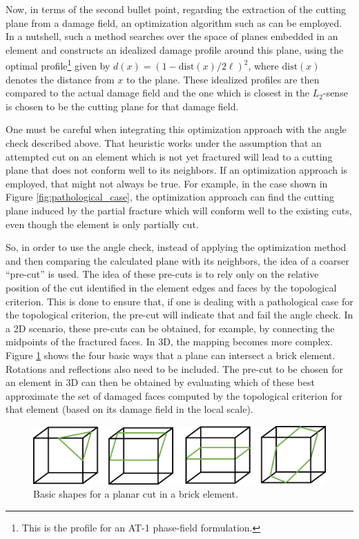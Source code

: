 Now, in terms of the second bullet point, regarding the extraction of the cutting plane from a damage field, an optimization algorithm such as \cite{geelen2018optimization} can be employed. In a nutshell, such a method searches over the space of planes embedded in an element and constructs an idealized damage profile around this plane, using the optimal profile\footnote{This is the profile for an AT-1 phase-field formulation.} given by $d(x) = (1-\text{dist}(x)/2\ell)^2$, where $\text{dist}(x)$ denotes the distance from $x$ to the plane. These idealized profiles are then compared to the actual damage field and the one which is closest in the $L_2$-sense is chosen to be the cutting plane for that damage field.

One must be careful when integrating this optimization approach with the angle check described above. That heuristic works under the assumption that an attempted cut on an element which is not yet fractured will lead to a cutting plane that does not conform well to its neighbors. If an optimization approach is employed, that might not always be true. For example, in the case shown in Figure \ref{fig:pathological_case}, the optimization approach can find the cutting plane induced by the partial fracture which will conform well to the existing cuts, even though the element is only partially cut.

So, in order to use the angle check, instead of applying the optimization method and then comparing the calculated plane with its neighbors, the idea of a coarser ``pre-cut'' is used. The idea of these pre-cuts is to rely only on the relative position of the cut identified in the element edges and faces by the topological criterion. This is done to ensure that, if one is dealing with a pathological case for the topological criterion, the pre-cut will indicate that and fail the angle check. In a 2D scenario, these pre-cuts can be obtained, for example, by connecting the midpoints of the fractured faces. In 3D, the mapping becomes more complex. Figure \ref{fig:pre_cuts} shows the four basic ways that a plane can intersect a brick element. Rotations and reflections also need to be included. The pre-cut to be chosen for an element in 3D can then be obtained by evaluating which of these best approximate the set of damaged faces computed by the topological criterion for that element (based on its damage field in the local scale). 

\begin{figure}[h]
    \centering
    \includegraphics[width=0.8\linewidth]{Chapter4/figures/nonplanar/pre_cuts.png}
    \caption{Basic shapes for a planar cut in a brick element.}
    \label{fig:pre_cuts}
\end{figure}

